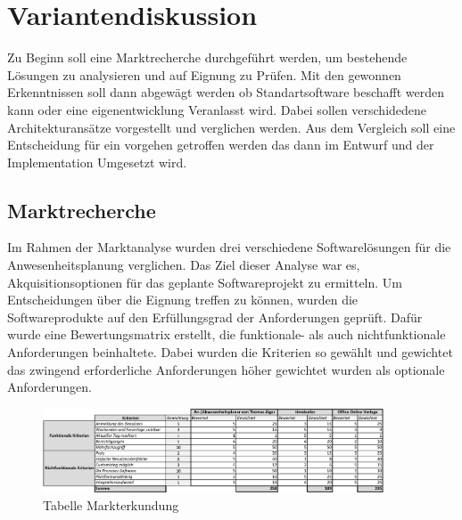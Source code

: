 \section{Variantendiskussion}
\label{sec:Variantendiskussion}
Zu Beginn soll eine Marktrecherche durchgeführt werden, um bestehende Lösungen zu analysieren und auf Eignung zu Prüfen. Mit den gewonnen Erkenntnissen soll dann abgewägt werden ob Standartsoftware beschafft werden kann oder eine eigenentwicklung Veranlasst wird. Dabei sollen verschidedene Architekturansätze vorgestellt und verglichen werden. Aus dem Vergleich soll eine Entscheidung für ein vorgehen getroffen werden das dann im Entwurf und der Implementation Umgesetzt wird.

\subsection{Marktrecherche}
\label{sec:Marktrecherche}
Im Rahmen der Marktanalyse wurden drei verschiedene Softwarelösungen für die Anwesenheitsplanung verglichen. Das Ziel dieser Analyse war es, Akquisitionsoptionen für das geplante Softwareprojekt zu ermitteln. Um Entscheidungen über die Eignung treffen zu können, wurden die Softwareprodukte auf den Erfüllungsgrad der Anforderungen geprüft. Dafür wurde eine Bewertungsmatrix erstellt, die funktionale- als auch nichtfunktionale Anforderungen beinhaltete. Dabei wurden die Kriterien so gewählt und gewichtet das zwingend erforderliche Anforderungen höher gewichtet wurden als optionale Anforderungen.

\begin{figure}[htb]
    \centering
    \includegraphics[width=0.9\textwidth,angle=0]{abb/Markterkundung.pdf}
    \caption[Beschreibung]{ Tabelle Markterkundung}
    \label{tab:Markterkundung}
\end{figure}

